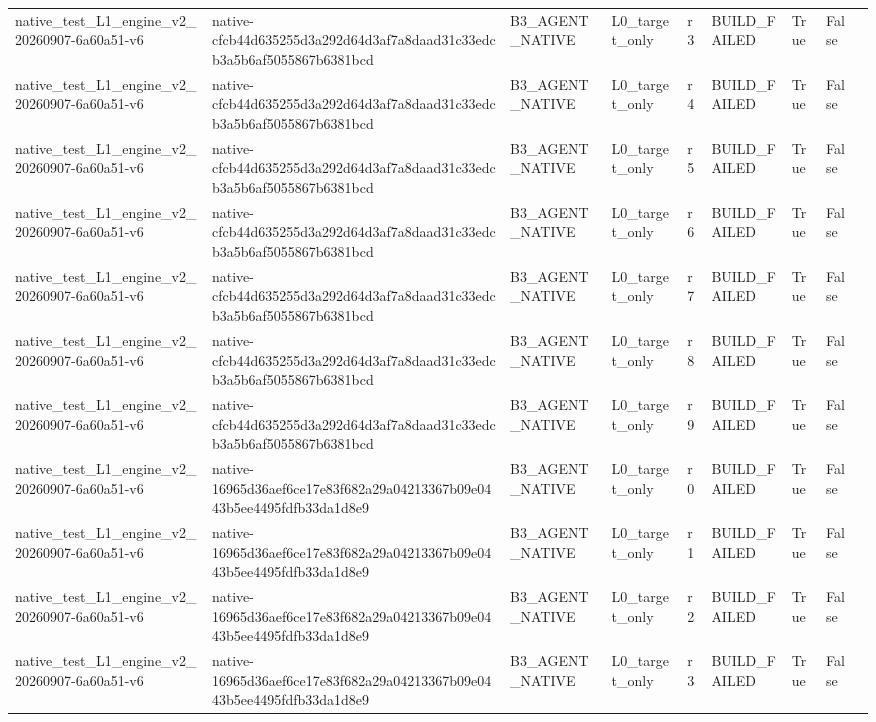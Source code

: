 \begin{tabular}{lllllllll}
native\_test\_L1\_engine\_v2\_20260907-6a60a51-v6 & native-cfcb44d635255d3a292d64d3af7a8daad31c33edcb3a5b6af5055867b6381bcd & B3\_AGENT\_NATIVE & L0\_target\_only & r3 & BUILD\_FAILED & True & False &  \\
native\_test\_L1\_engine\_v2\_20260907-6a60a51-v6 & native-cfcb44d635255d3a292d64d3af7a8daad31c33edcb3a5b6af5055867b6381bcd & B3\_AGENT\_NATIVE & L0\_target\_only & r4 & BUILD\_FAILED & True & False &  \\
native\_test\_L1\_engine\_v2\_20260907-6a60a51-v6 & native-cfcb44d635255d3a292d64d3af7a8daad31c33edcb3a5b6af5055867b6381bcd & B3\_AGENT\_NATIVE & L0\_target\_only & r5 & BUILD\_FAILED & True & False &  \\
native\_test\_L1\_engine\_v2\_20260907-6a60a51-v6 & native-cfcb44d635255d3a292d64d3af7a8daad31c33edcb3a5b6af5055867b6381bcd & B3\_AGENT\_NATIVE & L0\_target\_only & r6 & BUILD\_FAILED & True & False &  \\
native\_test\_L1\_engine\_v2\_20260907-6a60a51-v6 & native-cfcb44d635255d3a292d64d3af7a8daad31c33edcb3a5b6af5055867b6381bcd & B3\_AGENT\_NATIVE & L0\_target\_only & r7 & BUILD\_FAILED & True & False &  \\
native\_test\_L1\_engine\_v2\_20260907-6a60a51-v6 & native-cfcb44d635255d3a292d64d3af7a8daad31c33edcb3a5b6af5055867b6381bcd & B3\_AGENT\_NATIVE & L0\_target\_only & r8 & BUILD\_FAILED & True & False &  \\
native\_test\_L1\_engine\_v2\_20260907-6a60a51-v6 & native-cfcb44d635255d3a292d64d3af7a8daad31c33edcb3a5b6af5055867b6381bcd & B3\_AGENT\_NATIVE & L0\_target\_only & r9 & BUILD\_FAILED & True & False &  \\
native\_test\_L1\_engine\_v2\_20260907-6a60a51-v6 & native-16965d36aef6ce17e83f682a29a04213367b09e0443b5ee4495fdfb33da1d8e9 & B3\_AGENT\_NATIVE & L0\_target\_only & r0 & BUILD\_FAILED & True & False &  \\
native\_test\_L1\_engine\_v2\_20260907-6a60a51-v6 & native-16965d36aef6ce17e83f682a29a04213367b09e0443b5ee4495fdfb33da1d8e9 & B3\_AGENT\_NATIVE & L0\_target\_only & r1 & BUILD\_FAILED & True & False &  \\
native\_test\_L1\_engine\_v2\_20260907-6a60a51-v6 & native-16965d36aef6ce17e83f682a29a04213367b09e0443b5ee4495fdfb33da1d8e9 & B3\_AGENT\_NATIVE & L0\_target\_only & r2 & BUILD\_FAILED & True & False &  \\
native\_test\_L1\_engine\_v2\_20260907-6a60a51-v6 & native-16965d36aef6ce17e83f682a29a04213367b09e0443b5ee4495fdfb33da1d8e9 & B3\_AGENT\_NATIVE & L0\_target\_only & r3 & BUILD\_FAILED & True & False &  \\

\end{tabular}
